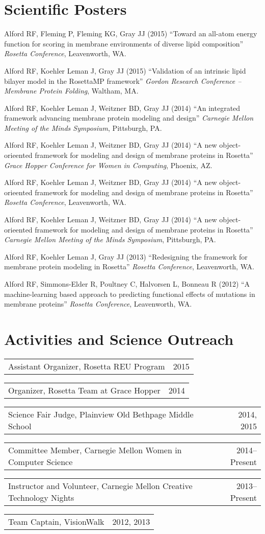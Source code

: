 \documentclass[11pt]{article}
\makeatletter
\newcommand{\allcapsspacing}[1]{{\addfontfeature{LetterSpace=7.5}#1}}
\newcommand{\yearitem}[2]{
\noindent
\begin{tabular*}{\textwidth}{@{\extracolsep{\fill}}lr}
		#1 & #2 \\
\end{tabular*}\vspace{0.5\baselineskip}}
\makeatother
\begin{document}
\section*{\allcapsspacing{Scientific Posters}}

\begin{etaremune}
\item Alford RF, Fleming P, Fleming KG, Gray JJ (2015) ``Toward an all-atom energy function for scoring in membrane environments of diverse lipid composition'' \textit{Rosetta Conference}, Leavenworth, WA.
\item Alford RF, Koehler Leman J, Gray JJ (2015) ``Validation of an intrinsic lipid bilayer model in the RosettaMP framework'' \textit{Gordon Research Conference -- Membrane Protein Folding}, Waltham, MA.
\item Alford RF, Koehler Leman J, Weitzner BD, Gray JJ (2014) ``An integrated framework advancing membrane protein modeling and design'' \textit{Carnegie Mellon Meeting of the Minds Symposium}, Pittsburgh, PA.
\item Alford RF, Koehler Leman J, Weitzner BD, Gray JJ (2014) ``A new object-orieented framework for modeling and design of membrane proteins in Rosetta'' \textit{Grace Hopper Conference for Women in Computing}, Phoenix, AZ.
\item Alford RF, Koehler Leman J, Weitzner BD, Gray JJ (2014) ``A new object-orieented framework for modeling and design of membrane proteins in Rosetta'' \textit{Rosetta Conference}, Leavenworth, WA.
\item Alford RF, Koehler Leman J, Weitzner BD, Gray JJ (2014) ``A new object-orieented framework for modeling and design of membrane proteins in Rosetta'' \textit{Carnegie Mellon Meeting of the Minds Symposium}, Pittsburgh, PA.
\item Alford RF, Koehler Leman J, Gray JJ (2013) ``Redesigning the framework for membrane protein modeling in Rosetta'' \textit{Rosetta Conference}, Leavenworth, WA.
\item Alford RF, Simmons-Elder R, Poultney C, Halvorsen L, Bonneau R (2012) ``A machine-learning based approach to predicting functional effects of mutations in membrane proteins'' \textit{Rosetta Conference}, Leavenworth, WA.
\end{etaremune}

\section*{\allcapsspacing{Activities and Science Outreach}}
\yearitem{Assistant Organizer, Rosetta REU Program}{2015}
\yearitem{Organizer, Rosetta Team at Grace Hopper}{2014}
\yearitem{Science Fair Judge, Plainview Old Bethpage Middle School}{2014, 2015}
\yearitem{Committee Member, Carnegie Mellon Women in Computer Science}{2014--Present}
\yearitem{Instructor and Volunteer, Carnegie Mellon Creative Technology Nights}{2013--Present}
\yearitem{Team Captain, VisionWalk}{2012, 2013}
\end{document}
